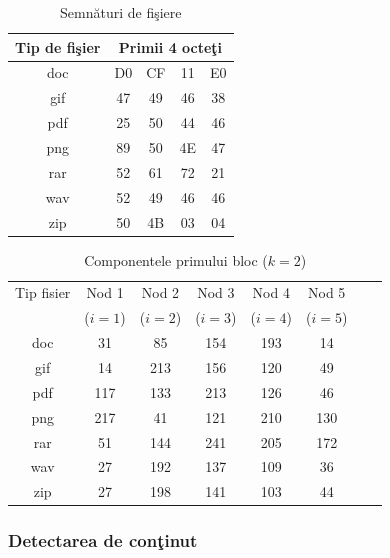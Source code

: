 \documentclass{llncs}
\begin{document}
\begin{table}
\bigskip
\begin{center}
\caption{Semn\u{a}turi de fi\c{s}iere}\label{tb:margins}
\label{table:sign}
\begin{tabular}{ccccc}
Tip de fi\c{s}ier &  \multicolumn{4}{c}{Primii 4 octe\c{t}i}\\ \hline 
doc &  D0 & CF & 11 & E0\\
gif & 47 & 49 & 46 & 38 \\
pdf & 25 & 50 & 44 & 46 \\
png & 89 & 50 & 4E & 47 \\
rar & 52 & 61 & 72 & 21 \\
wav & 52 & 49 & 46 & 46 \\
zip & 50 & 4B & 03 & 04\\  \hline
\end{tabular}
\end{center}
\bigskip
\end{table}

\begin{table}
\begin{center}
\caption{Componentele primului bloc ($k=2$)}\label{tb:margins}
\label{table:shares}
\begin{tabular}{cccccccc}
Tip fisier & Nod 1 & Nod 2 & Nod 3 & Nod 4 & Nod 5 \\
  & ($i=1$) & ($i=2$) & ($i=3$) & ($i=4$) & ($i=5$) \\
\hline
doc & 31 & 85 & 154 & 193 & 14 \\
gif & 14 & 213 & 156 & 120 & 49 \\
pdf & 117 & 133 & 213 & 126 & 46 \\
png & 217 & 41 & 121 & 210 & 130 \\ 
rar & 51 & 144 & 241 & 205 & 172  \\
wav & 27 & 192 & 137 & 109 & 36 \\
zip & 27 & 198 & 141 & 103 & 44 \\ \hline
\end{tabular}
\end{center}
\bigskip
\end{table}


\subsubsection{Detectarea de con\c{t}inut}\hspace*{\fill} \\
\label{subsec:file_content_detection}
\end{document}
